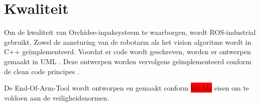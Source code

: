 \section{Kwaliteit}

Om de kwaliteit van Orchidee-inpaksysteem te waarborgen, wordt ROS-industrial gebruikt. 
Zowel de aansturing van de robotarm als het vision algoritme wordt in C++ geïmplementeerd.
Voordat er code wordt geschreven, worden er ontwerpen gemaakt in UML \cite{UML}.
Deze ontwerpen worden vervolgens geïmplementeerd conform de clean code principes \cite{CLEAN_CODE}.

De End-Of-Arm-Tool wordt ontworpen en gemaakt conform \colorbox{red}{bla bla} eisen om te voldoen aan de veiligheidsnormen.

\newpage